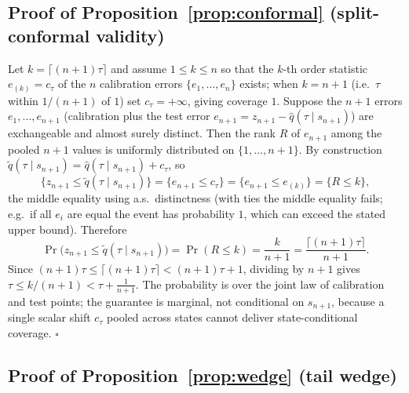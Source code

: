 \documentclass[11pt]{article}
\theoremstyle{remark}
\begin{document}
\subsection*{Proof of Proposition~\ref{prop:conformal} (split-conformal
validity)}

Let $k=\lceil(n{+}1)\tau\rceil$ and assume $1\le k\le n$ so that the
$k$-th order statistic $e_{(k)}=c_\tau$ of the $n$ calibration errors
$\{e_1,\dots,e_n\}$ exists; when $k=n+1$ (i.e.\ $\tau$ within $1/(n+1)$
of $1$) set $c_\tau=+\infty$, giving coverage $1$. Suppose the $n+1$
errors $e_1,\dots,e_{n+1}$ (calibration plus the test error
$e_{n+1}=z_{n+1}-\widehat q(\tau\mid s_{n+1})$) are exchangeable and
almost surely distinct. Then the rank $R$ of $e_{n+1}$ among the pooled
$n+1$ values is uniformly distributed on $\{1,\dots,n+1\}$. By
construction $\widetilde q(\tau\mid s_{n+1})=\widehat q(\tau\mid
s_{n+1})+c_\tau$, so
\[
\{z_{n+1}\le\widetilde q(\tau\mid s_{n+1})\}
=\{e_{n+1}\le c_\tau\}
=\{e_{n+1}\le e_{(k)}\}
=\{R\le k\},
\]
the middle equality using a.s.\ distinctness (with ties the middle
equality fails; e.g.\ if all $e_i$ are equal the event has probability
$1$, which can exceed the stated upper bound). Therefore
\[
\Pr\big(z_{n+1}\le\widetilde q(\tau\mid s_{n+1})\big)
=\Pr(R\le k)=\frac{k}{n+1}
=\frac{\lceil(n{+}1)\tau\rceil}{n+1}.
\]
Since $(n{+}1)\tau\le\lceil(n{+}1)\tau\rceil<(n{+}1)\tau+1$, dividing by
$n+1$ gives $\tau\le k/(n+1)<\tau+\tfrac1{n+1}$. The probability is over
the joint law of calibration and test points; the guarantee is
marginal, not conditional on $s_{n+1}$, because a single scalar shift
$c_\tau$ pooled across states cannot deliver state-conditional
coverage. \hfill$\square$

\subsection*{Proof of Proposition~\ref{prop:wedge} (tail wedge)}
\end{document}
